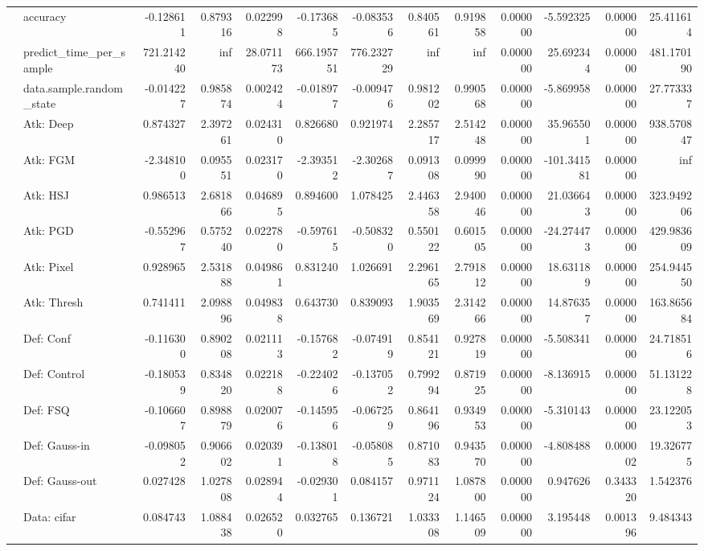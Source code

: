 \begin{table}[htbp]
\begin{tabular}{llrrrrrrrrrrr}
 & accuracy & -0.128611 & 0.879316 & 0.022998 & -0.173685 & -0.083536 & 0.840561 & 0.919858 & 0.000000 & -5.592325 & 0.000000 & 25.411614 \\
 & predict\_time\_per\_sample & 721.214240 & inf & 28.071173 & 666.195751 & 776.232729 & inf & inf & 0.000000 & 25.692344 & 0.000000 & 481.170190 \\
 & data.sample.random\_state & -0.014227 & 0.985874 & 0.002424 & -0.018977 & -0.009476 & 0.981202 & 0.990568 & 0.000000 & -5.869958 & 0.000000 & 27.773337 \\
 & Atk: Deep & 0.874327 & 2.397261 & 0.024310 & 0.826680 & 0.921974 & 2.285717 & 2.514248 & 0.000000 & 35.965501 & 0.000000 & 938.570847 \\
 & Atk: FGM & -2.348100 & 0.095551 & 0.023170 & -2.393512 & -2.302687 & 0.091308 & 0.099990 & 0.000000 & -101.341581 & 0.000000 & inf \\
 & Atk: HSJ & 0.986513 & 2.681866 & 0.046895 & 0.894600 & 1.078425 & 2.446358 & 2.940046 & 0.000000 & 21.036643 & 0.000000 & 323.949206 \\
 & Atk: PGD & -0.552967 & 0.575240 & 0.022780 & -0.597615 & -0.508320 & 0.550122 & 0.601505 & 0.000000 & -24.274473 & 0.000000 & 429.983609 \\
 & Atk: Pixel & 0.928965 & 2.531888 & 0.049861 & 0.831240 & 1.026691 & 2.296165 & 2.791812 & 0.000000 & 18.631189 & 0.000000 & 254.944550 \\
 & Atk: Thresh & 0.741411 & 2.098896 & 0.049838 & 0.643730 & 0.839093 & 1.903569 & 2.314266 & 0.000000 & 14.876357 & 0.000000 & 163.865684 \\
 & Def: Conf & -0.116300 & 0.890208 & 0.021113 & -0.157682 & -0.074919 & 0.854121 & 0.927819 & 0.000000 & -5.508341 & 0.000000 & 24.718516 \\
 & Def: Control & -0.180539 & 0.834820 & 0.022188 & -0.224026 & -0.137052 & 0.799294 & 0.871925 & 0.000000 & -8.136915 & 0.000000 & 51.131228 \\
 & Def: FSQ & -0.106607 & 0.898879 & 0.020076 & -0.145956 & -0.067259 & 0.864196 & 0.934953 & 0.000000 & -5.310143 & 0.000000 & 23.122053 \\
 & Def: Gauss-in & -0.098052 & 0.906602 & 0.020391 & -0.138018 & -0.058085 & 0.871083 & 0.943570 & 0.000000 & -4.808488 & 0.000002 & 19.326775 \\
 & Def: Gauss-out & 0.027428 & 1.027808 & 0.028944 & -0.029301 & 0.084157 & 0.971124 & 1.087800 & 0.000000 & 0.947626 & 0.343320 & 1.542376 \\
 & Data: cifar & 0.084743 & 1.088438 & 0.026520 & 0.032765 & 0.136721 & 1.033308 & 1.146509 & 0.000000 & 3.195448 & 0.001396 & 9.484343 \\

\end{tabular}
\end{table}
